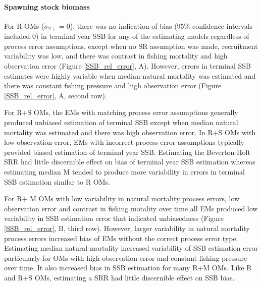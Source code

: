 \documentclass[
  12pt,
]{article}
\begin{document}
\hypertarget{spawning-stock-biomass}{%
\paragraph*{Spawning stock biomass}\label{spawning-stock-biomass}}

For R OMs (\(\sigma_{2+} = 0\)), there was no indication of bias (95\%
confidence intervals included 0) in terminal year SSB for any of the
estimating models regardless of process error assumptions, except when
no SR assumption was made, recruitment variability was low, and there
was contrast in fishing mortality and high observation error (Figure
\ref{SSB_rel_error}, A). However, errors in terminal SSB estimates were
highly variable when median natural mortality was estimated and there
was constant fishing pressure and high observation error (Figure
\ref{SSB_rel_error}, A, second row).

For R+S OMs, the EMs with matching process error assumptions generally
produced unbiased estimation of terminal SSB except when median natural
mortality was estimated and there was high observation error. In R+S OMs
with low observation error, EMs with incorrect process error assumptions
typically provided biased estimation of terminal year SSB. Estimating
the Beverton-Holt SRR had little discernible effect on bias of terminal
year SSB estimation whereas estimating median M tended to produce more
variability in errors in terminal SSB estimation similar to R OMs.

For R+ M OMs with low variability in natural mortality process errors,
low observation error and contrast in fishing motality over time all EMs
produced low variability in SSB estimation error that indicated
unbiasedness (Figure \ref{SSB_rel_error}, B, third row). However, larger
variability in natural mortality process errors increased bias of EMs
without the correct process error type. Estimating median natural
mortality increased variability of SSB estimation error particularly for
OMs with high observation error and constant fishing pressure over time.
It also increased bias in SSB estimation for many R+M OMs. Like R and
R+S OMs, estimating a SRR had little discernible effect on SSB bias.
\end{document}
